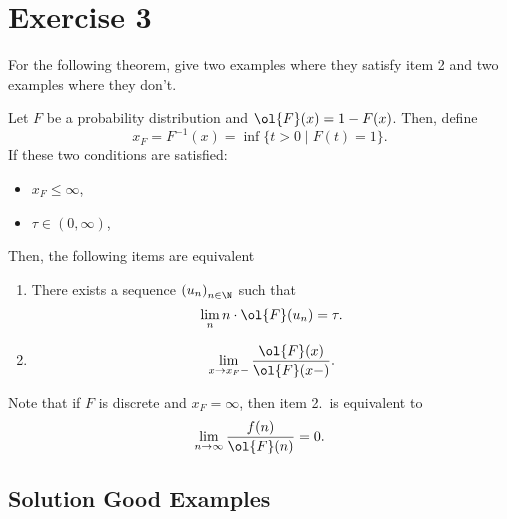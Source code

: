 \section{Exercise 3}

For the following theorem, give two examples where they satisfy item 2 and two examples where they don't.

\begin{theorem}
    Let $F$ be a probability distribution and $\ol{F}(x) = 1-F(x)$. Then, define
    \[ x_F = F^{-1}(x) = \inf\{t > 0 \;|\; F(t) = 1\}. \]
    If these two conditions are satisfied:
    \begin{itemize}
        \item $x_F \leq \infty$,
        \item $\tau \in (0,\infty)$,
    \end{itemize}
    Then, the following items are equivalent
    \begin{enumerate}
        \item There exists a sequence ${(u_n)}_{n\in\N}$ such that
        \[ \lim_n n \cdot \ol{F}(u_n) = \tau. \]
        \item 
        \[ \lim_{x\to x_F-} \frac{\ol{F}(x)}{\ol{F}(x-)}. \]
    \end{enumerate}
    Note that if $F$ is discrete and $x_F = \infty$, then item 2.~is equivalent to
    \[ \lim_{n \to \infty} \frac{f(n)}{\ol{F}(n)} = 0.\]
\end{theorem}
\subsection*{Solution Good Examples}

